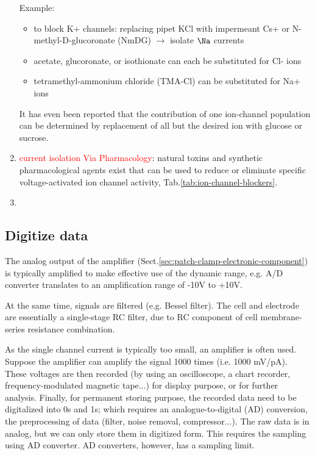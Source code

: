 \begin{enumerate}
Example:
\begin{itemize}
  \item to block K+ channels: replacing pipet KCl with impermeant Cs+ or
  N-methyl-D-glucoronate (NmDG) $\rightarrow$ isolate $\Na$ currents

  \item  acetate,
glucoronate, or isothionate can each be substituted for Cl- ions

  \item tetramethyl-ammonium chloride (TMA-Cl) can be substituted
for Na+ ions
\end{itemize}
It has even been reported that the contribution of one ion-channel population
can be determined by replacement of all but the desired ion with glucose or sucrose.


  \item \textcolor{red}{current isolation Via Pharmacology}: natural toxins and
  synthetic pharmacological agents
exist that can be used to reduce or eliminate specific voltage-activated ion
channel activity,  Tab.\ref{tab:ion-channel-blockers}.

\item
\end{enumerate}



\subsection{Digitize data}
\label{sec:digitize-data}

The analog output of the amplifier
(Sect.\ref{sec:patch-clamp-electronic-component}) is typically amplified to make
effective use of the dynamic range, e.g. A/D converter translates to an
amplification range of -10V to +10V.

At the same time, signals are filtered (e.g. Bessel filter).
The cell and electrode are essentially a single-stage RC filter, due to RC
component of cell membrane-series resistance combination.

As the single channel current is typically too small, an amplifier is often
used.   Suppose the amplifier can amplify the signal 1000 times (i.e. 1000
mV/pA). These voltages are then recorded (by using an oscilloscope, a chart
recorder, frequency-modulated magnetic tape...)  for display purpose, or for
further analysis. Finally, for permanent storing purpose, the recorded data need
to be digitalized into 0s and 1s; which requires an analogue-to-digital (AD)
conversion, the preprocessing of data (filter, noise removal, compressor...).
The raw data is in analog, but we can only store them in digitized form. This
requires the sampling using AD converter. AD converters, however, has a sampling
limit.



